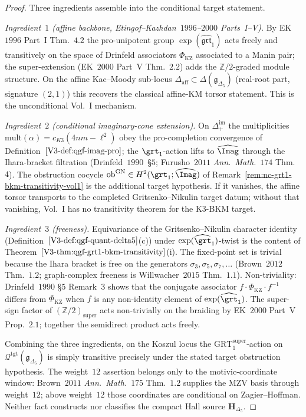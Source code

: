 \begin{proof}
Three ingredients assemble into the conditional target statement.

\emph{Ingredient~$1$ (affine backbone, Etingof--Kazhdan~$1996$--$2000$
Parts~I--V).} By EK~$1996$ Part~I Thm.~$4.2$ the pro-unipotent group
$\exp(\widehat{\mathfrak{grt}}_1)$ acts freely and transitively on
the space of Drinfeld associators $\Phi_{\mathrm{KZ}}$ associated to
a Manin pair; the super-extension (EK~$2000$ Part~V Thm.~$2.2$) adds
the $\mathbb Z/2$-graded module structure. On the affine Kac--Moody
sub-locus $\Delta_{\mathrm{aff}}\subset\Delta(\mathfrak g_{\Delta_5})$
(real-root part, signature $(2, 1)$) this
recovers the classical affine-KM torsor statement. This is the
unconditional Vol.~I mechanism.

\emph{Ingredient~$2$ (conditional imaginary-cone extension).} On
$\Delta_+^{\mathrm{im}}$ the multiplicities $\mathrm{mult}(\alpha) =
c_{K3}(4nm - \ell^2)$ obey the pro-completion convergence of
Definition~$\ref{V3-def:qgf-imag-pro}$; the $\grt_1$-action lifts to
$\widehat{\Imag}$ through the Ihara-bracket filtration
(Drinfeld~$1990$~\S$5$; Furusho~$2011$ \emph{Ann.\ Math.}~$174$
Thm.~$4$). The obstruction cocycle
$\mathrm{ob}^{\mathrm{GN}} \in H^2(\grt_1;\widehat\Imag)$ of
Remark~\ref{rem:nc-grt1-bkm-transitivity-vol1} is the additional
target hypothesis. If it vanishes, the affine torsor transports to the
completed Gritsenko--Nikulin target datum; without that vanishing,
Vol.~I has no transitivity theorem for the K$3$-BKM target.

\emph{Ingredient~$3$ (freeness).} Equivariance of the
Gritsenko--Nikulin character identity
(Definition~$\ref{V3-def:qgf-quant-delta5}$(c)) under
$\exp(\widehat{\grt}_1)$-twist is the content of
Theorem~$\ref{V3-thm:qgf-grt1-bkm-transitivity}$(i). The fixed-point set
is trivial because the Ihara bracket is free on the generators
$\sigma_3, \sigma_5, \sigma_7, \ldots$ (Brown~$2012$ Thm.~$1.2$;
graph-complex freeness is Willwacher~$2015$ Thm.~$1.1$).
Non-triviality: Drinfeld~$1990$ \S$5$ Remark~$3$ shows that the
conjugate associator $f\cdot\Phi_{\mathrm{KZ}}\cdot f^{-1}$ differs
from $\Phi_{\mathrm{KZ}}$ when $f$ is any non-identity element of
$\exp(\widehat\grt_1)$. The super-sign factor of
$(\mathbb Z/2)_{\mathrm{super}}$ acts non-trivially on the braiding
by EK~$2000$ Part~V Prop.~$2.1$; together the semidirect product
acts freely.

Combining the three ingredients, on the Koszul locus the
$\mathrm{GRT}_1^{\mathrm{super}}$-action on
$\mathcal Q^{\mathrm{tgt}}(\mathfrak g_{\Delta_5})$ is simply
transitive precisely under the stated target obstruction hypothesis.
The weight~$12$ assertion belongs only to the motivic-coordinate
window: Brown~$2011$ \emph{Ann.\ Math.}~$175$ Thm.~$1.2$ supplies the
MZV basis through weight~$12$; above weight~$12$ those coordinates are
conditional on Zagier--Hoffman. Neither fact constructs nor classifies
the compact Hall source $\mathbf H_{\Delta_5}$.
\end{proof}

